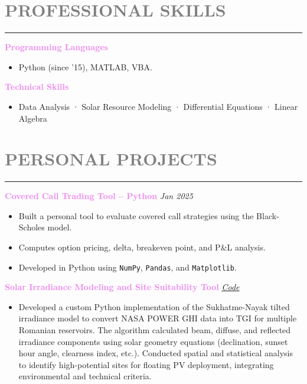 \documentclass[10pt,a4paper]{article}
\newcommand{\myrule}{\noindent\rule{\linewidth}{0.4pt}}
\begin{document}
\section*{\textcolor{gray}{PROFESSIONAL SKILLS}}
\myrule
\vspace{1ex}
\textbf{\textcolor{violet}{Programming Languages}} 
\begin{itemize}
  \item Python (since ’15), MATLAB, VBA.
  
\end{itemize}

\vspace{0.5ex}

\textbf{\textcolor{violet}{Technical Skills}} \\[-3.0ex]
\begin{itemize}
  \item Data Analysis · Solar Resource Modeling · Differential Equations · Linear Algebra 
\end{itemize}

\vspace{0.1cm}

\section*{\textcolor{gray}{PERSONAL PROJECTS}}
\myrule

\textbf{\textcolor{violet}{Covered Call Trading Tool – Python}} \hfill \textit{Jan 2025} \\[-3.0ex]
\begin{itemize}
  \item Built a personal tool to evaluate covered call strategies using the Black-Scholes model.
  \item Computes option pricing, delta, breakeven point, and P\&L analysis.
  \item Developed in Python using \texttt{NumPy}, \texttt{Pandas}, and \texttt{Matplotlib}.
\end{itemize}

\vspace{0.1cm}


\textbf{\textcolor{violet}{ Solar Irradiance Modeling and Site Suitability Tool}} \hfill \textit{\href{https://github.com/aurelianpanait/Solar-Energy-Modeling-for-Floating-Photovoltaic-Systems-on-Inland-Reservoirs}{Code}} \\[-3.0ex]
\begin{itemize}
  \item Developed a custom Python implementation of the Sukhatme-Nayak tilted irradiance model to convert NASA POWER GHI data into TGI for multiple Romanian reservoirs. The algorithm calculated beam, diffuse, and reflected irradiance components using solar geometry equations (declination, sunset hour angle, clearness index, etc.). Conducted spatial and statistical analysis to identify high-potential sites for floating PV deployment, integrating environmental and technical criteria.
  
\end{itemize}
\end{document}
